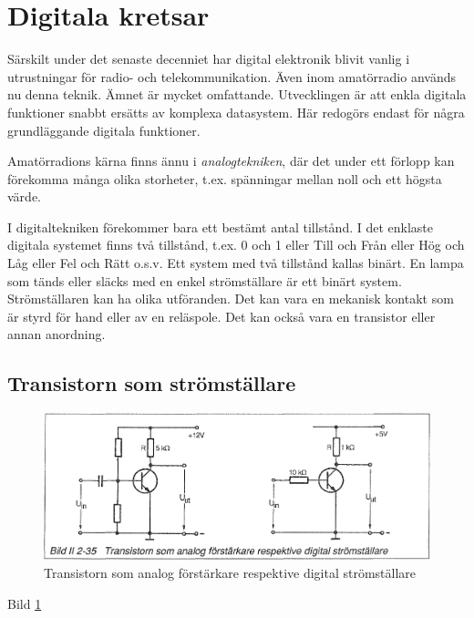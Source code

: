 \section{Digitala kretsar}
\label{digitala kretsar}

Särskilt under det senaste decenniet har digital elektronik blivit vanlig i
utrustningar för radio- och telekommunikation. Även inom amatörradio används nu
denna teknik. Ämnet är mycket omfattande. Utvecklingen är att enkla digitala
funktioner snabbt ersätts av komplexa datasystem. Här redogörs endast för några
grundläggande digitala funktioner.

Amatörradions kärna finns ännu i \emph{analogtekniken}, där det under ett
förlopp kan förekomma många olika storheter, t.ex. spänningar mellan noll och
ett högsta värde.

I digitaltekniken förekommer bara ett bestämt antal tillstånd. I det enklaste
digitala systemet finns två tillstånd, t.ex. 0 och 1 eller Till och Från eller
Hög och Låg eller Fel och Rätt o.s.v. Ett system med två tillstånd kallas
binärt. En lampa som tänds eller släcks med en enkel strömställare är ett binärt
system. Strömställaren kan ha olika utföranden. Det kan vara en mekanisk kontakt
som är styrd för hand eller av en reläspole. Det kan också vara en transistor
eller annan anordning.

\subsection{Transistorn som strömställare}

\begin{figure}[h]
\begin{center}
\includegraphics[width=14cm]{images/bild_2_2-35}
\caption{Transistorn som analog förstärkare respektive digital strömställare}
\label{fig:BildII2-35}
\end{center}
\end{figure}

Bild \ref{fig:BildII2-35}

